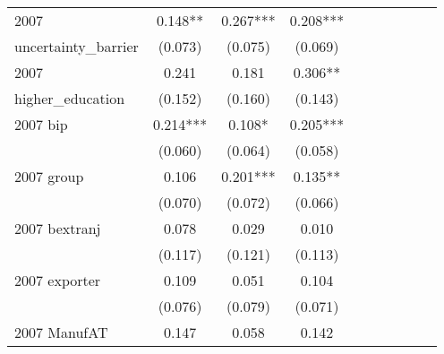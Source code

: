 \begin{table}[htbp]
\begin{tabular}{l*{9}{c}}
2007                &       0.148** &       0.267***&       0.208***&               &               &               &               &               &               \\
uncertainty\_barrier &     (0.073)   &     (0.075)   &     (0.069)   &               &               &               &               &               &               \\
2007                &       0.241   &       0.181   &       0.306** &               &               &               &               &               &               \\
higher\_education    &     (0.152)   &     (0.160)   &     (0.143)   &               &               &               &               &               &               \\
2007 bip            &       0.214***&       0.108*  &       0.205***&               &               &               &               &               &               \\
                    &     (0.060)   &     (0.064)   &     (0.058)   &               &               &               &               &               &               \\
2007 group          &       0.106   &       0.201***&       0.135** &               &               &               &               &               &               \\
                    &     (0.070)   &     (0.072)   &     (0.066)   &               &               &               &               &               &               \\
2007 bextranj       &       0.078   &       0.029   &       0.010   &               &               &               &               &               &               \\
                    &     (0.117)   &     (0.121)   &     (0.113)   &               &               &               &               &               &               \\
2007 exporter       &       0.109   &       0.051   &       0.104   &               &               &               &               &               &               \\
                    &     (0.076)   &     (0.079)   &     (0.071)   &               &               &               &               &               &               \\
2007 ManufAT        &       0.147   &       0.058   &       0.142   &               &               &               &               &               &               \\

\end{tabular}
\end{table}
